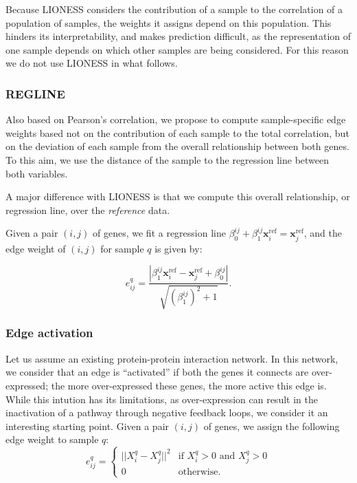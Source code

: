 \documentclass{bioinfo}
\newcommand{\xref}{{\bm x}^{\mbox{ref}}}
\begin{document}
\begin{methods}
Because LIONESS considers the contribution of a sample to the correlation of a population of samples, the weights it assigns depend on this population. This hinders its interpretability, and makes prediction difficult, as the representation of one sample depends on which other samples are being considered. For this reason we do not use LIONESS in what follows.

\subsubsection{REGLINE}
Also based on Pearson's correlation, we propose to compute sample-specific edge weights based not on the contribution of each sample to the total correlation, but on the deviation of each sample from the overall relationship between both genes. To this aim, we use the distance of the sample to the regression line between both variables.

A major difference with LIONESS is that we compute this overall relationship, or regression line, over the {\em reference} data.

Given a pair $(i, j)$ of genes, we fit a regression line $\beta_0^{ij} + \beta_1^{ij} \xref_i = \xref_j$, and the edge weight of $(i, j)$ for sample $q$ is given by:

\[
e_{ij}^q = \frac{|\beta_1^{ij} \xref_i - \xref_j + \beta_0^{ij}|}{\sqrt{(\beta_1^{ij})^2+1}}.
\]

\subsubsection{Edge activation}
Let us assume an existing protein-protein interaction network. 
In this network, we consider that an edge is ``activated'' if both the genes it connects are over-expressed; the more over-expressed these genes, the more active this edge is. 
While this intution has its limitations, as over-expression can result in the inactivation of a pathway through negative feedback loops, we consider it an interesting starting point.
Given a pair $(i, j)$ of genes, we assign the following edge weight to sample $q$:
\begin{equation}
e_{ij}^q = \begin{cases} ||X_i^q - X_j^q||^2 &\mbox{if } X_i^q > 0 \mbox{ and } X_j^q > 0 \\
0 & \mbox{otherwise.}
\end{cases}
\end{equation}




\end{methods}
\end{document}
